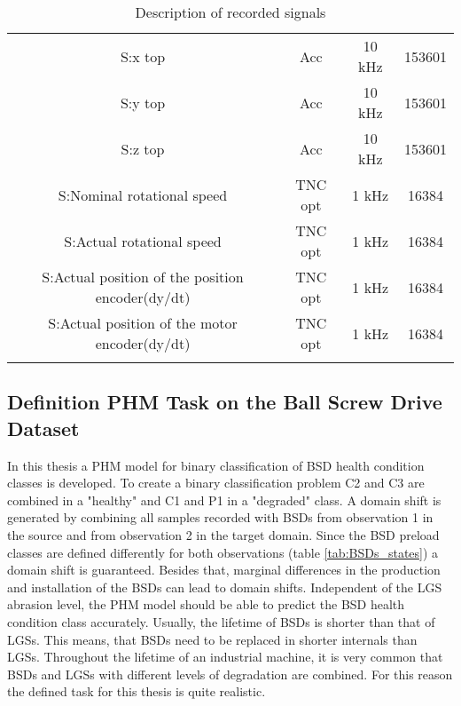 \begin{center}
\begin{longtable}{c c c c}
 S:x top & Acc & 10 kHz & 153601 \\ 

 S:y top & Acc & 10 kHz & 153601 \\ 
 
 S:z top & Acc & 10 kHz & 153601 \\ 
 
 S:Nominal rotational speed & TNC opt & 1 kHz & 16384 \\
 
 S:Actual rotational speed & TNC opt & 1 kHz & 16384 \\ 
 
 S:Actual position of the position encoder(dy/dt) & TNC opt & 1 kHz & 16384 \\ 
 S:Actual position of the motor encoder(dy/dt)  & TNC opt & 1 kHz & 16384  \\ [1ex] 
 \bottomrule
\caption {Description of recorded signals}
\label {tab:description_of_the_49_recorded_features}
\end{longtable}
\end{center}


\subsection{Definition PHM Task on the Ball Screw Drive Dataset}
In this thesis a PHM model for binary classification of BSD health condition classes is developed. To create a binary classification problem C2 and C3 are combined in a "healthy" and C1 and P1 in a "degraded" class. A domain shift is generated by combining all samples recorded with BSDs from observation 1 in the source and from observation 2 in the target domain. Since the BSD preload classes are defined differently for both observations (table \ref{tab:BSDs_states}) a domain shift is guaranteed. Besides that, marginal differences in the production and installation of the BSDs can lead to domain shifts. Independent of the LGS abrasion level, the PHM model should be able to predict the BSD health condition class accurately. Usually, the lifetime of BSDs is shorter than that of LGSs. This means, that BSDs need to be replaced in shorter internals than LGSs. Throughout the lifetime of an industrial machine, it is very common that BSDs and LGSs with different levels of degradation are combined. For this reason the defined task for this thesis is quite realistic.

